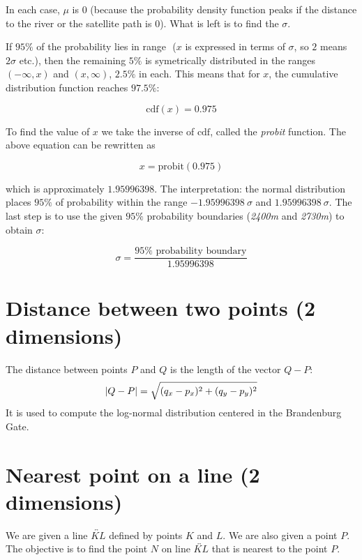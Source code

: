 \documentclass[a4paper,12pt]{article}
\begin{document}
In each case, \(\mu\) is \(0\) (because the probability density function peaks if the distance
to the river or the satellite path is \(0\)). What is left is to find the \(\sigma\).

If \(95\%\) of the probability lies in range \(<-x, x>\) (\(x\) is expressed in terms of \(\sigma\), so \(2\) means \(2\sigma\) etc.),
then the remaining \(5\%\) is symetrically distributed in the ranges \((-\infty, x)\) and \((x, \infty)\), \(2.5\%\) in each.
This means that for \(x\), the cumulative distribution function reaches \(97.5\%\):

\[\mbox{cdf}(x) = 0.975\]

To find the value of \(x\) we take the inverse of \(\mbox{cdf}\), called the \emph{probit} function. The above equation can
be rewritten as

\[x = \mbox{probit}(0.975)\]

which is approximately \(1.95996398\). The interpretation: the normal distribution places \(95\%\) of probability
within the range \(-1.95996398\: \sigma\) and \(1.95996398\: \sigma\).
The last step is to use the given \(95\%\) probability boundaries (\emph{2400m} and \emph{2730m})
to obtain \(\sigma\):

\[\sigma = \frac{\mbox{\(95\%\) probability boundary}}{1.95996398}\]

\section{Distance between two points (2 dimensions)}

The distance between points \(P\) and \(Q\) is the length of the vector \(Q - P\):
\[\abs{Q - P} = \sqrt{(q_x - p_x)^2 + (q_y - p_y)^2}\]
It is used to compute the log-normal distribution centered in the Brandenburg Gate.

\section{Nearest point on a line (2 dimensions)}

We are given a line \(\overleftrightarrow{KL}\) defined by points \(K\) and \(L\).
We are also given a point \(P\).
The objective is to find the point \(N\) on line \(\overleftrightarrow{KL}\)
that is nearest to the point \(P\).
\end{document}
